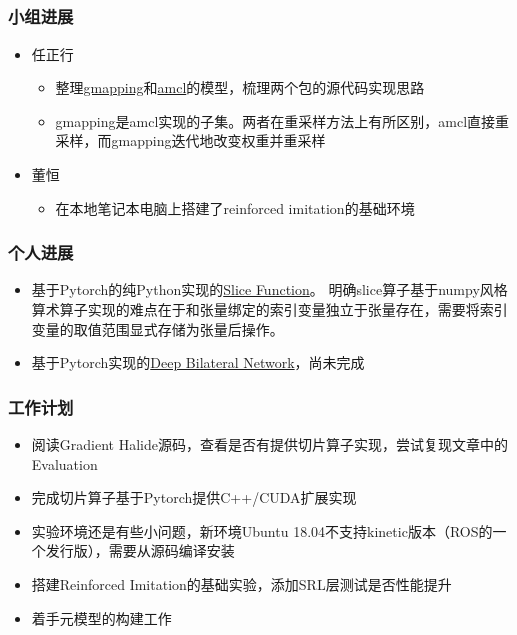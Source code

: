 \subsection{\ZhangYX}

\subsubsection{小组进展}

\begin{itemize}
\item 任正行
  \begin{itemize}
    \item 整理\href{http://wiki.ros.org/gmapping}{gmapping}和\href{http://wiki.ros.org/amcl}{amcl}的模型，梳理两个包的源代码实现思路
    \item gmapping是amcl实现的子集。两者在重采样方法上有所区别，amcl直接重采样，而gmapping迭代地改变权重并重采样
  \end{itemize}
\item 董恒
  \begin{itemize}
    \item 在本地笔记本电脑上搭建了reinforced imitation的基础环境
  \end{itemize}
\end{itemize}

\subsubsection{个人进展}

\begin{itemize}
  \item 基于Pytorch的纯Python实现的\href{https://github.com/yuxi-zh/auto-gredient/blob/master/pytorch/slice.py}{Slice Function}。
  明确slice算子基于numpy风格算术算子实现的难点在于和张量绑定的索引变量独立于张量存在，需要将索引变量的取值范围显式存储为张量后操作。
  \item 基于Pytorch实现的\href{https://github.com/yuxi-zh/auto-gredient/blob/master/pytorch/deep_bilateral.py}{Deep Bilateral Network}，尚未完成
\end{itemize}

\subsubsection{工作计划}

\ZhangYX
\begin{itemize}
  \item 阅读Gradient Halide源码，查看是否有提供切片算子实现，尝试复现文章中的Evaluation
  \item 完成切片算子基于Pytorch提供C++/CUDA扩展实现
\end{itemize}

\DongH
\begin{itemize}
  \item 实验环境还是有些小问题，新环境Ubuntu 18.04不支持kinetic版本（ROS的一个发行版），需要从源码编译安装
  \item 搭建Reinforced Imitation的基础实验，添加SRL层测试是否性能提升
\end{itemize}

\RenZH
\begin{itemize}
  \item 着手元模型的构建工作
\end{itemize}